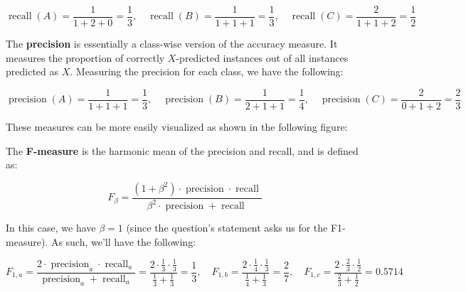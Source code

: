 \documentclass[12pt]{article}
\begin{document}
\begin{enumerate}[leftmargin=\labelsep]
        \begin{equation*}
          \operatorname{recall}(A) = \frac{1}{1 + 2 + 0} = \frac{1}{3}, \quad
          \operatorname{recall}(B) = \frac{1}{1 + 1 + 1} = \frac{1}{3}, \quad
          \operatorname{recall}(C) = \frac{2}{1 + 1 + 2} = \frac{1}{2}
        \end{equation*}

        The \textbf{precision} is essentially a class-wise version of the accuracy
        measure. It measures the proportion of correctly $X$-predicted instances out of all
        instances predicted as $X$. Measuring the precision for each class, we have the following:

        \begin{equation*}
          \operatorname{precision}(A) = \frac{1}{1 + 1 + 1} = \frac{1}{3}, \quad
          \operatorname{precision}(B) = \frac{1}{2 + 1 + 1} = \frac{1}{4}, \quad
          \operatorname{precision}(C) = \frac{2}{0 + 1 + 2} = \frac{2}{3}
        \end{equation*}

        These measures can be more easily visualized as shown in the following figure:

        \begin{figure}[H]
          \centering
          
        \end{figure}

        The \textbf{F-measure} is the harmonic mean of the precision and recall, and is
        defined as:

        \begin{equation*}
          F_\beta = \frac{(1 + \beta^2) \cdot \operatorname{precision} \cdot \operatorname{recall}}
          {\beta^2 \cdot \operatorname{precision} + \operatorname{recall}}
        \end{equation*}

        In this case, we have $\beta = 1$ (since the question's statement asks us
        for the F1-measure). As such, we'll have the following:

        \begin{equation*}
          F_{1,a} = \frac{2 \cdot \operatorname{precision}_a \cdot \operatorname{recall}_a}
          {\operatorname{precision}_a + \operatorname{recall}_a}
          = \frac{2 \cdot \frac{1}{3} \cdot \frac{1}{3}}{\frac{1}{3} + \frac{1}{3}}
          = \frac{1}{3}, \quad
          F_{1,b} = \frac{2 \cdot \frac{1}{4} \cdot \frac{1}{3}}{\frac{1}{4} + \frac{1}{3}}
          = \frac{2}{7}, \quad
          F_{1,c} = \frac{2 \cdot \frac{2}{3} \cdot \frac{1}{2}}{\frac{2}{3} + \frac{1}{2}}
          = 0.5714
        \end{equation*}


\end{enumerate}
\end{document}
